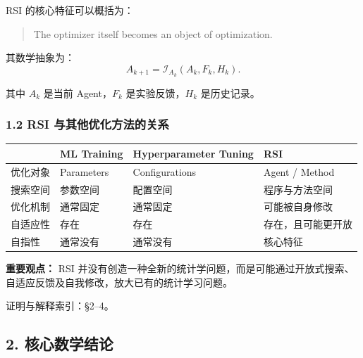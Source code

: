 RSI 的核心特征可以概括为：

\begin{quote}
The optimizer itself becomes an object of optimization.
\end{quote}

其数学抽象为：
\[A_{k+1}
=
\mathcal I_{A_k}(A_k,F_k,H_k).\]

其中 \(A_k\) 是当前 Agent，\(F_k\) 是实验反馈，\(H_k\) 是历史记录。

\hypertarget{part-1-10-0001-rsi-ux4e0eux5176ux4ed6ux4f18ux5316ux65b9ux6cd5ux7684ux5173ux7cfb}{%
\subsubsection{1.2 RSI 与其他优化方法的关系}\label{part-1-10-0001-rsi-ux4e0eux5176ux4ed6ux4f18ux5316ux65b9ux6cd5ux7684ux5173ux7cfb}}

\begin{readertable}
\begin{longtable}[]{@{}
  >{\raggedright\arraybackslash}p{}
  >{\raggedright\arraybackslash}p{}
  >{\raggedright\arraybackslash}p{}
  >{\raggedright\arraybackslash}p{}@{}}
\toprule
& ML Training & Hyperparameter Tuning & RSI \\
\midrule
\endhead
优化对象 & Parameters & Configurations & Agent / Method \\
搜索空间 & 参数空间 & 配置空间 & 程序与方法空间 \\
优化机制 & 通常固定 & 通常固定 & 可能被自身修改 \\
自适应性 & 存在 & 存在 & 存在，且可能更开放 \\
自指性 & 通常没有 & 通常没有 & 核心特征 \\
\bottomrule
\end{longtable}
\end{readertable}

\textbf{重要观点：} RSI 并没有创造一种全新的统计学问题，而是可能通过开放式搜索、自适应反馈及自我修改，放大已有的统计学习问题。

证明与解释索引：§2--4。

\hypertarget{part-1-10-0001-ux6838ux5fc3ux6570ux5b66ux7ed3ux8bba}{%
\subsection{2. 核心数学结论}\label{part-1-10-0001-ux6838ux5fc3ux6570ux5b66ux7ed3ux8bba}}

